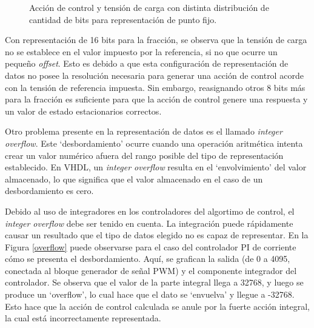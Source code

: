 \begin{figure}[hbt!]
    \centering
    \caption{Acción de control y tensión de carga con distinta distribución de cantidad de bits para representación de punto fijo.}
    \label{error-datos}
\end{figure}

Con representación de 16 bits para la fracción, se observa que la tensión de carga no se establece en el valor impuesto por la referencia, si no que ocurre un pequeño \emph{offset}. Esto es debido a que esta configuración de representación de datos no posee la resolución necesaria para generar una acción de control acorde con la tensión de referencia impuesta. Sin embargo, reasignando otros 8 bits más para la fracción es suficiente para que la acción de control genere una respuesta y un valor de estado estacionarios correctos. 

Otro problema presente en la representación de datos es el llamado \emph{integer overflow}. Este `desbordamiento' ocurre cuando una operación aritmética intenta crear un valor numérico afuera del rango posible del tipo de representación establecido. En VHDL, un \emph{integer overflow} resulta en el `envolvimiento' del valor almacenado, lo que significa que el valor almacenado en el caso de un desbordamiento es cero.

Debido al uso de integradores en los controladores del algortimo de control, el \emph{integer overflow} debe ser tenido en cuenta. La integración puede rápidamente causar un resultado que el tipo de datos elegido no es capaz de representar. En la Figura \ref{overflow} puede observarse para el caso del controlador PI de corriente cómo se presenta el desbordamiento. Aquí, se grafican la salida (de 0 a 4095, conectada al bloque generador de señal PWM) y el componente integrador del controlador. Se observa que el valor de la parte integral llega a 32768, y luego se produce un `overflow', lo cual hace que el dato se `envuelva' y llegue a -32768. Esto hace que la acción de control calculada se anule por la fuerte acción integral, la cual está incorrectamente representada.

